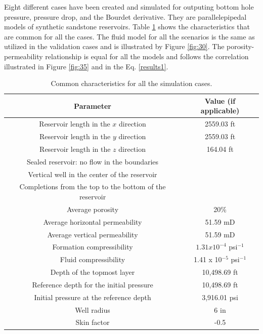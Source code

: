 Eight different cases have been created and simulated for outputing bottom hole pressure, pressure drop, and the Bourdet derivative. They are parallelepipedal models of synthetic sandstone reservoirs. Table \ref{table10.1} shows the characteristics that are common for all the cases. The fluid model for all the scenarios is the same as utilized in the validation cases and is illustrated by Figure \ref{fig:30}. The porosity-permeability relationship is equal for all the models and follows the correlation illustrated in Figure \ref{fig:35} and in the Eq. \ref{results1}.
\begin{table}[htbp]
	\centering
	\caption{Common characteristics for all the simulation cases.}
	\begin{tabular}{c c}
	\toprule
	Parameter & Value (if applicable)\\
	\midrule
	Reservoir length in the $x$ direction & 2559.03 ft\\
	Reservoir length in the $y$ direction & 2559.03 ft\\
	Reservoir length in the $z$ direction & 164.04 ft\\
	Sealed reservoir: no flow in the boundaries\\
	Vertical well in the center of the reservoir\\
	Completions from the top to the bottom of the reservoir\\
	Average porosity & 20\%\\
	Average horizontal permeability & 51.59 mD\\
	Average vertical permeability & 51.59 mD\\
	Formation compressibility & $1.31 x 10^{-4}$ psi$^{-1}$\\
	Fluid compressibility &  1.41 x 10$^{-5}$ psi$^{-1}$\\
	Depth of the topmost layer & 10,498.69 ft\\
	Reference depth for the initial pressure & 10,498.69 ft\\
	Initial pressure at the reference depth & 3,916.01 psi\\
	Well radius & 6 in\\
	Skin factor & -0.5\\
	\bottomrule
\end{tabular}
	\label{table10.1}
\end{table}

